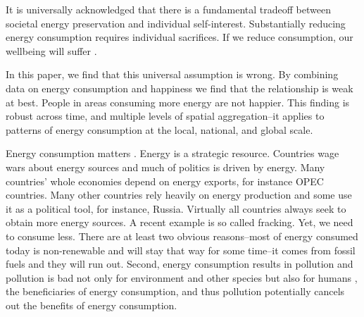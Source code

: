 \documentclass[10pt, letterpaper]{article}
\begin{document}
\begin{spacing}{1.4}
It is universally acknowledged that there is a fundamental tradeoff between
societal energy preservation and individual self-interest. Substantially reducing
energy consumption requires individual sacrifices. If we reduce consumption, our wellbeing will
suffer \cite{kenny_businessweek_aug_29_14, gordon_wsj_may_29_14, carter_pbs_apr_18_77}. 

In this paper, we find that this universal assumption is wrong.  By combining
data on energy consumption and happiness we find that the
relationship is weak at best. %
 People in areas consuming more energy are not happier.
This finding is robust across time, and multiple levels of spatial aggregation--it applies to patterns of energy consumption  at the local, national, and global scale.  



Energy consumption matters %
. Energy is a strategic
resource. Countries wage wars about energy sources  and much of politics is
driven by energy. Many countries' whole economies depend on energy exports, for instance OPEC countries. Many other countries rely heavily on energy production
and some use it as a political tool, for instance, Russia.   
Virtually all countries  always seek to obtain more energy sources. A recent example is so called
fracking. Yet, we need to consume less. There are at least two
obvious reasons--most of energy consumed today is non-renewable and will stay
that way for some time\cite{mackay08}--it comes from
fossil fuels and they will run out. %
Second, energy consumption results in pollution and pollution is bad not only
for environment and other species but also for humans \cite{mackerron09,gandelman12,ferreira13}, the beneficiaries of energy
consumption, and thus pollution potentially cancels out the benefits of energy
consumption. 
 

\end{spacing}
\end{document}
